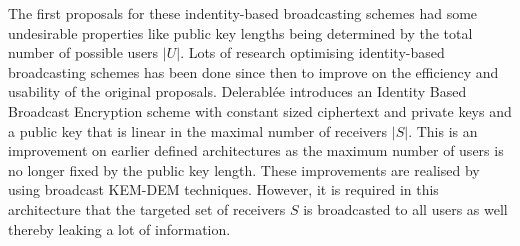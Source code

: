 \documentclass[journal]{IEEEtran}
\begin{document}
The first proposals for these indentity-based broadcasting schemes had some
undesirable properties like public key lengths being determined by the total
number of possible users $|U|$. Lots of research optimising
identity-based broadcasting schemes has been done since then to improve on the
efficiency and usability of the original proposals. Delerabl\'ee introduces an
Identity Based Broadcast Encryption scheme with constant sized ciphertext and
private keys and a public key that is linear in the maximal number of
receivers $|S|$. This is an improvement on earlier defined
architectures as the maximum number of users is no longer fixed by the public
key length. These improvements are realised by using broadcast KEM-DEM
techniques. However, it is required in this architecture that the targeted set
of receivers $S$ is broadcasted to all users as well thereby leaking a lot of
information.~\cite{DelerableeIBBE}
\end{document}

